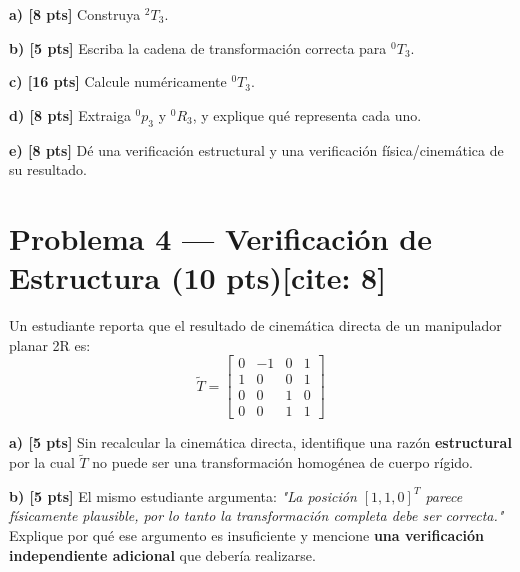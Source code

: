 \documentclass[11pt, a4paper]{article}
\begin{document}
\textbf{a) [8 pts]} Construya ${}^{2}T_3$.

\textbf{b) [5 pts]} Escriba la cadena de transformación correcta para ${}^{0}T_3$.

\textbf{c) [16 pts]} Calcule numéricamente ${}^{0}T_3$.

\textbf{d) [8 pts]} Extraiga ${}^{0}p_3$ y ${}^{0}R_3$, y explique qué representa cada uno.

\textbf{e) [8 pts]} Dé una verificación estructural y una verificación física/cinemática de su resultado.

\section*{Problema 4 — Verificación de Estructura (10 pts)[cite: 8]}
Un estudiante reporta que el resultado de cinemática directa de un manipulador planar 2R es:
\begin{equation*}
    \tilde{T} = \begin{bmatrix} 0 & -1 & 0 & 1 \\ 1 & 0 & 0 & 1 \\ 0 & 0 & 1 & 0 \\ 0 & 0 & 1 & 1 \end{bmatrix}
\end{equation*}

\textbf{a) [5 pts]} Sin recalcular la cinemática directa, identifique una razón \textbf{estructural} por la cual $\tilde{T}$ no puede ser una transformación homogénea de cuerpo rígido.

\textbf{b) [5 pts]} El mismo estudiante argumenta: \textit{"La posición $[1, 1, 0]^T$ parece físicamente plausible, por lo tanto la transformación completa debe ser correcta."} Explique por qué ese argumento es insuficiente y mencione \textbf{una verificación independiente adicional} que debería realizarse.
\end{document}
